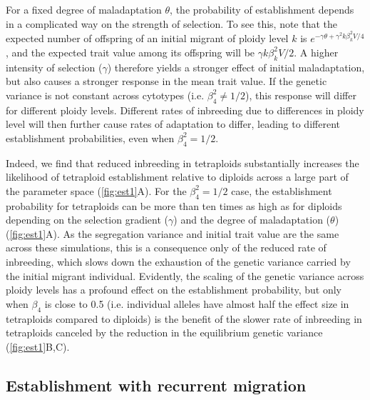 \documentclass[12pt,a4paper]{article}
\begin{document}
For a fixed degree of maladaptation $\theta$, the probability of establishment
depends in a complicated way on the strength of selection.
To see this, note that the expected number of offspring of an initial migrant
of ploidy level $k$ is $e^{-\gamma \theta + \gamma^2 k\beta_k^2 V/4}$, and the
expected trait value among its offspring will be $\gamma k \beta_k^2 V/2$.
A higher intensity of selection ($\gamma$) therefore yields a stronger effect
of initial maladaptation, but also causes a stronger response in the mean trait
value.
If the genetic variance is not constant across cytotypes (i.e. $\beta_4^2 \ne
1/2$), this response will differ for different ploidy levels.
Different rates of inbreeding due to differences in ploidy level will then
further cause rates of adaptation to differ, leading to different establishment
probabilities, even when $\beta_4^2=1/2$.

Indeed, we find that reduced inbreeding in tetraploids substantially increases the
likelihood of tetraploid establishment relative to diploids across a large
part of the parameter space (\cref{fig:est1}A).
For the $\beta_4^2 = 1/2$ case, the establishment probability for
tetraploids can be more than ten times as high as for diploids depending on the
selection gradient ($\gamma$) and the degree of maladaptation ($\theta$)
(\cref{fig:est1}A).
As the segregation variance and initial trait value are the same across these
simulations, this is a consequence only of the reduced rate of inbreeding,
which slows down the exhaustion of the genetic variance carried by the initial
migrant individual.
Evidently, the scaling of the genetic variance across ploidy levels has a
profound effect on the establishment probability, but only when $\beta_4$ is
close to 0.5 (i.e. individual alleles have almost half the effect size in
tetraploids compared to diploids) is the benefit of the slower rate of
inbreeding in tetraploids canceled by the reduction in the equilibrium genetic
variance (\cref{fig:est1}B,C).



\subsection*{Establishment with recurrent migration}
\end{document}
